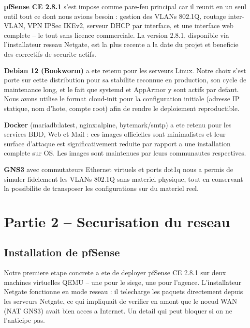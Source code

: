 \documentclass[11pt,a4paper]{article}
\begin{document}
\textbf{pfSense CE 2.8.1} s'est impose comme pare-feu principal car il reunit en un seul outil tout ce dont nous avions besoin : gestion des VLANs 802.1Q, routage inter-VLAN, VPN IPSec IKEv2, serveur DHCP par interface, et une interface web complete -- le tout sans licence commerciale. La version 2.8.1, disponible via l'installateur reseau Netgate, est la plus recente a la date du projet et beneficie des correctifs de securite actifs.

\textbf{Debian 12 (Bookworm)} a ete retenu pour les serveurs Linux. Notre choix s'est porte sur cette distribution pour sa stabilite reconnue en production, son cycle de maintenance long, et le fait que systemd et AppArmor y sont actifs par defaut. Nous avons utilise le format cloud-init pour la configuration initiale (adresse IP statique, nom d'hote, compte root) afin de rendre le deploiement reproductible.

\textbf{Docker} (mariadb:latest, nginx:alpine, bytemark/smtp) a ete retenu pour les services BDD, Web et Mail : ces images officielles sont minimalistes et leur surface d'attaque est significativement reduite par rapport a une installation complete sur OS. Les images sont maintenues par leurs communautes respectives.

\textbf{GNS3} avec commutateurs Ethernet virtuels et ports dot1q nous a permis de simuler fidelement les VLANs 802.1Q sans materiel physique, tout en conservant la possibilite de transposer les configurations sur du materiel reel.

\section{Partie 2 -- Securisation du reseau}

\subsection{Installation de pfSense}

Notre premiere etape concrete a ete de deployer pfSense CE 2.8.1 sur deux machines virtuelles QEMU -- une pour le siege, une pour l'agence. L'installateur Netgate fonctionne en mode reseau : il telecharge les paquets directement depuis les serveurs Netgate, ce qui impliquait de verifier en amont que le noeud WAN (NAT GNS3) avait bien acces a Internet. Un detail qui peut bloquer si on ne l'anticipe pas.
\end{document}
